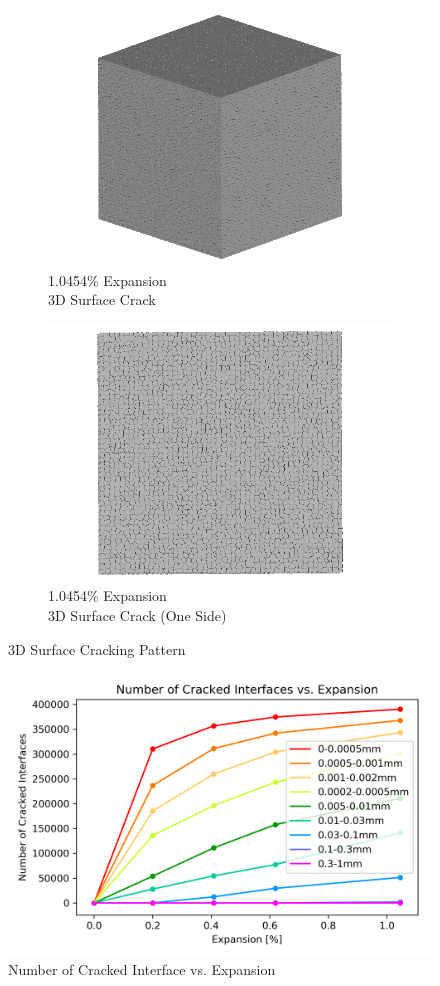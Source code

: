 \begin{figure}[ht!]
    \begin{subfigure}{.5\textwidth}
      \centering
      \includegraphics[width=0.5\linewidth]{Files/exp_3D/DEF/A30X-1C_4_3d.png}
      \caption{1.0454\% Expansion\\3D Surface Crack}
    \end{subfigure}%
    \begin{subfigure}{.5\textwidth}
      \centering
      \includegraphics[width=0.5\linewidth]{Files/exp_3D/DEF/A30X-1C_4_3ds.png}
      \caption{1.0454\% Expansion\\3D Surface Crack (One Side)}
    \end{subfigure}%

\caption{3D Surface Cracking Pattern}
\label{fig:A30_3Dcrack}
\end{figure}

\begin{figure}[ht!]
\centering
\includegraphics[width=.8\linewidth]{Files/interface/A30X-1CCRACK.png}
  \caption{Number of Cracked Interface vs. Expansion}
  \label{A30X-1CCRACK}
\end{figure}
